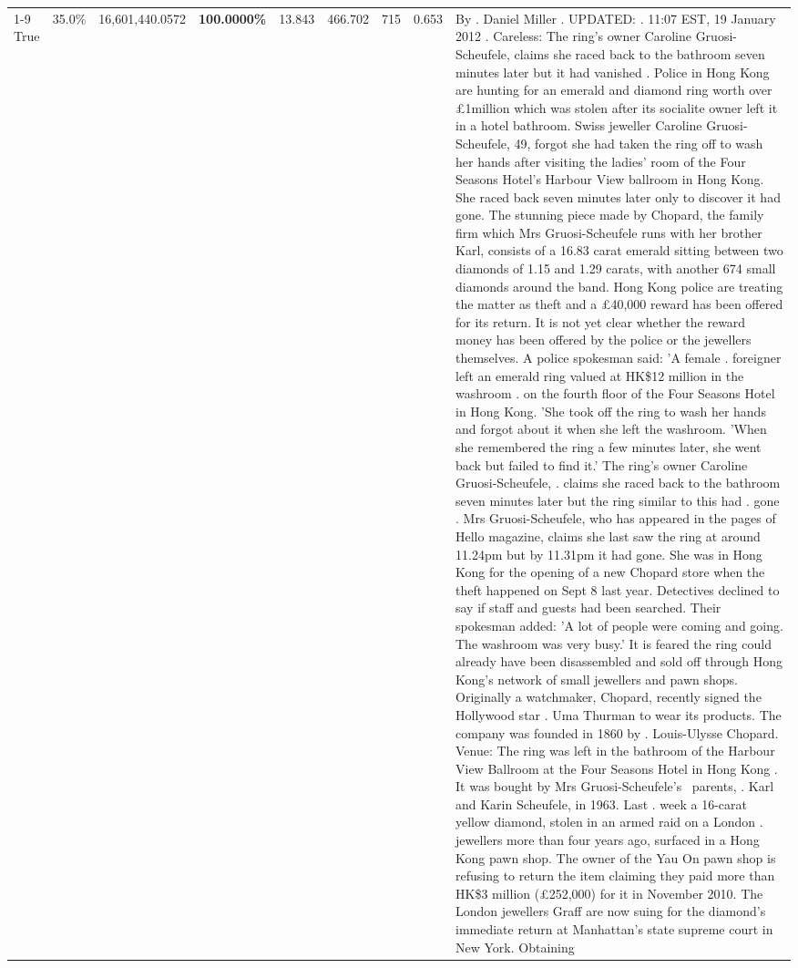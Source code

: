 \begin{table}[H]
\begin{tabular}{lllrlllll}
\cline{1-9}
True & 35.0\% & 16,601,440.0572 & \bfseries \color{red} 100.0000\% & 13.843 & 466.702 & 715 & 0.653 & By . Daniel Miller . UPDATED: . 11:07 EST, 19 January 2012 . Careless: The ring's owner Caroline Gruosi-Scheufele, claims she raced back to the bathroom seven minutes later but it had vanished . Police in Hong Kong are hunting for an emerald and diamond ring worth over £1million which was stolen after its socialite owner left it in a hotel bathroom. Swiss jeweller Caroline Gruosi-Scheufele, 49, forgot she had taken the ring off to wash her hands after visiting the ladies' room of the Four Seasons Hotel's Harbour View ballroom in Hong Kong. She raced back seven minutes later only to discover it had gone. The stunning piece made by Chopard, the family firm which Mrs Gruosi-Scheufele runs with her brother Karl, consists of a 16.83 carat emerald sitting between two diamonds of 1.15 and 1.29 carats, with another 674 small diamonds around the band. Hong Kong police are treating the matter as theft and a £40,000 reward has been offered for its return. It is not yet clear whether the reward money has been offered by the police or the jewellers themselves. A police spokesman said: 'A female . foreigner left an emerald ring valued at HK\$12 million in the washroom . on the fourth floor of the Four Seasons Hotel in Hong Kong. 'She took off the ring to wash her hands and forgot about it when she left the washroom. 'When she remembered the ring a few minutes later, she went back but failed to find it.' The ring's owner Caroline Gruosi-Scheufele, . claims she raced back to the bathroom seven minutes later but the ring similar to this had . gone . Mrs Gruosi-Scheufele, who has appeared in the pages of Hello magazine, claims she last saw the ring at around 11.24pm but by 11.31pm it had gone. She was in Hong Kong for the opening of a new Chopard store when the theft happened on Sept 8 last year. Detectives declined to say if staff and guests had been searched. Their spokesman added: 'A lot of people were coming and going. The washroom was very busy.' It is feared the ring could already have been disassembled and sold off through Hong Kong's network of small jewellers and pawn shops. Originally a watchmaker, Chopard, recently signed the Hollywood star . Uma Thurman to wear its products. The company was founded in 1860 by . Louis-Ulysse Chopard. Venue: The ring was left in the bathroom of the Harbour View Ballroom at the Four Seasons Hotel in Hong Kong . It was bought by Mrs Gruosi-Scheufele's  parents, . Karl and Karin Scheufele, in 1963. Last . week a 16-carat yellow diamond, stolen in an armed raid on a London . jewellers more than four years ago, surfaced in a Hong Kong pawn shop. The owner of the Yau On pawn shop is refusing to return the item claiming they paid more than HK\$3 million (£252,000) for it in November 2010. The London jewellers Graff are now suing for the diamond’s immediate return at Manhattan’s state supreme court in New York. Obtaining \\

\end{tabular}
\end{table}

